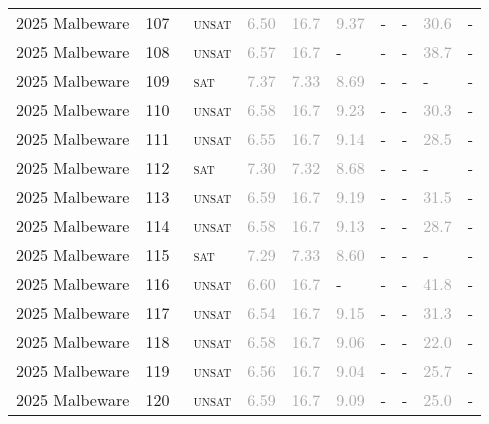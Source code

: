 \begin{center}
{\begin{longtable}{@{}llllllllll@{}}
2025 Malbeware & 107 & ~\textsc{unsat} & \textcolor{darkgray}{6.50} & \textcolor{darkgray}{16.7} & \textcolor{darkgray}{9.37} & - & - & \textcolor{darkgray}{30.6} & - \\
2025 Malbeware & 108 & ~\textsc{unsat} & \textcolor{darkgray}{6.57} & \textcolor{darkgray}{16.7} & - & - & - & \textcolor{darkgray}{38.7} & - \\
2025 Malbeware & 109 & ~\textsc{sat} & \textcolor{darkgray}{7.37} & \textcolor{darkgray}{7.33} & \textcolor{darkgray}{8.69} & - & - & - & - \\
2025 Malbeware & 110 & ~\textsc{unsat} & \textcolor{darkgray}{6.58} & \textcolor{darkgray}{16.7} & \textcolor{darkgray}{9.23} & - & - & \textcolor{darkgray}{30.3} & - \\
2025 Malbeware & 111 & ~\textsc{unsat} & \textcolor{darkgray}{6.55} & \textcolor{darkgray}{16.7} & \textcolor{darkgray}{9.14} & - & - & \textcolor{darkgray}{28.5} & - \\
2025 Malbeware & 112 & ~\textsc{sat} & \textcolor{darkgray}{7.30} & \textcolor{darkgray}{7.32} & \textcolor{darkgray}{8.68} & - & - & - & - \\
2025 Malbeware & 113 & ~\textsc{unsat} & \textcolor{darkgray}{6.59} & \textcolor{darkgray}{16.7} & \textcolor{darkgray}{9.19} & - & - & \textcolor{darkgray}{31.5} & - \\
2025 Malbeware & 114 & ~\textsc{unsat} & \textcolor{darkgray}{6.58} & \textcolor{darkgray}{16.7} & \textcolor{darkgray}{9.13} & - & - & \textcolor{darkgray}{28.7} & - \\
2025 Malbeware & 115 & ~\textsc{sat} & \textcolor{darkgray}{7.29} & \textcolor{darkgray}{7.33} & \textcolor{darkgray}{8.60} & - & - & - & - \\
2025 Malbeware & 116 & ~\textsc{unsat} & \textcolor{darkgray}{6.60} & \textcolor{darkgray}{16.7} & - & - & - & \textcolor{darkgray}{41.8} & - \\
2025 Malbeware & 117 & ~\textsc{unsat} & \textcolor{darkgray}{6.54} & \textcolor{darkgray}{16.7} & \textcolor{darkgray}{9.15} & - & - & \textcolor{darkgray}{31.3} & - \\
2025 Malbeware & 118 & ~\textsc{unsat} & \textcolor{darkgray}{6.58} & \textcolor{darkgray}{16.7} & \textcolor{darkgray}{9.06} & - & - & \textcolor{darkgray}{22.0} & - \\
2025 Malbeware & 119 & ~\textsc{unsat} & \textcolor{darkgray}{6.56} & \textcolor{darkgray}{16.7} & \textcolor{darkgray}{9.04} & - & - & \textcolor{darkgray}{25.7} & - \\
2025 Malbeware & 120 & ~\textsc{unsat} & \textcolor{darkgray}{6.59} & \textcolor{darkgray}{16.7} & \textcolor{darkgray}{9.09} & - & - & \textcolor{darkgray}{25.0} & - \\

\end{longtable}}
\end{center}
